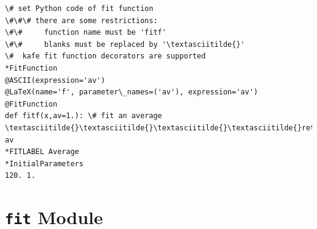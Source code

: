 \documentclass[a4paper,10pt,english]{sphinxmanual}
\begin{document}
\begin{fulllineitems}
\begin{Verbatim}[commandchars=\\\{\}]
\# set Python code of fit function
\#\#\# there are some restrictions:
\#\#     function name must be 'fitf'
\#\#     blanks must be replaced by '\textasciitilde{}'
\#  kafe fit function decorators are supported
*FitFunction
@ASCII(expression='av')
@LaTeX(name='f', parameter\_names=('av'), expression='av')
@FitFunction
def fitf(x,av=1.): \# fit an average
\textasciitilde{}\textasciitilde{}\textasciitilde{}\textasciitilde{}return av
*FITLABEL Average
*InitialParameters
120. 1.
\end{Verbatim}

\end{fulllineitems}



\section{\texttt{fit} Module}
\label{index:fit-module}\label{index:module-kafe.fit}\label{index:module-fit}
\end{document}
